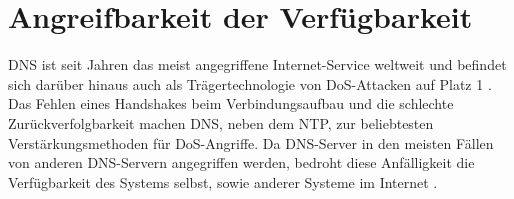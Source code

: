 \section{Angreifbarkeit der Verfügbarkeit}
\label{sec:thread-dosamp}

DNS ist seit Jahren das meist angegriffene Internet-Service weltweit und befindet sich darüber hinaus auch als Trägertechnologie von DoS-Attacken auf Platz 1 \cite{Alcoy2017}. Das Fehlen eines Handshakes beim Verbindungsaufbau und die schlechte Zurückverfolgbarkeit machen DNS, neben dem \ac{NTP}, zur beliebtesten Verstärkungsmethoden für DoS-Angriffe. Da DNS-Server in den meisten Fällen von anderen DNS-Servern angegriffen werden, bedroht diese Anfälligkeit die Verfügbarkeit des Systems selbst, sowie anderer Systeme im Internet \cite{Kambourakis2008}.